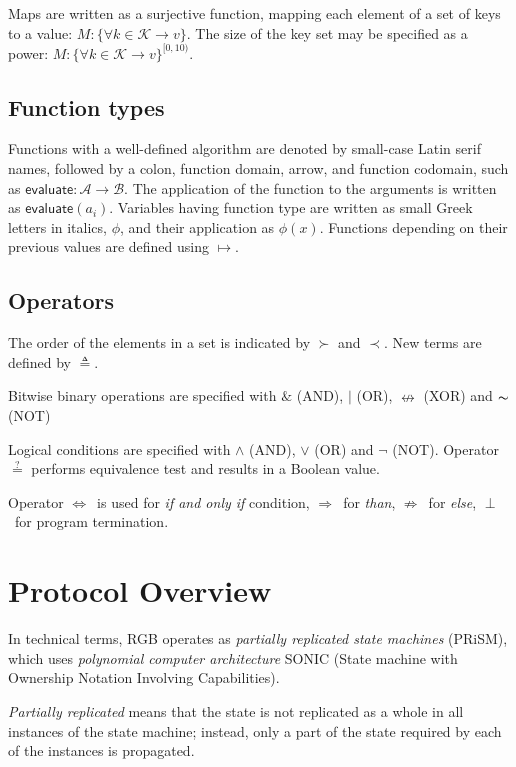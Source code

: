 \documentclass[9pt,oneside]{amsart}
\begin{document}
\begin{multicols}{2}
Maps are written as a surjective function, mapping each element of a set of keys to a value:
$M: \{ \forall k \in \mathcal{K} \rightarrow v \}$.
The size of the key set may be specified as a power:
$M: \{ \forall k \in \mathcal{K} \rightarrow v \}^{[0, 10)}$.

\subsection{Function types}

Functions with a well-defined algorithm are denoted by small-case Latin serif names,
followed by a colon, function domain, arrow, and function codomain,
such as $\mathsf{evaluate}: \mathcal{A} \rightarrow \mathcal{B}$.
The application of the function to the arguments is written as $\mathsf{evaluate}(a_i)$.
Variables having function type are written as small Greek letters in italics, $\phi$,
and their application as $\phi(x)$.
Functions depending on their previous values are defined using
$\mapsto$.

\subsection{Operators}
The order of the elements in a set is indicated by $\succ$ and $\prec$.
New terms are defined by $\triangleq$.

Bitwise binary operations are specified with $\&$ (AND), $|$ (OR),
$\nleftrightarrow$ (XOR) and $\thicksim$ (NOT)

Logical conditions are specified with $\land$ (AND), $\lor$ (OR) and $\lnot$ (NOT).
Operator $\stackrel{?}{=}$ performs equivalence test and results in a Boolean value.

Operator $\Longleftrightarrow$~is used for \emph{if and only if} condition,
$\Rightarrow$~for \emph{than}, $\nRightarrow$~for \emph{else}, $\perp$~for program termination.

\section{Protocol Overview}

In technical terms, RGB operates as \emph{partially replicated state machines} (PRiSM),
which uses \emph{polynomial computer architecture} SONIC
(State machine with Ownership Notation Involving Capabilities).

\emph{Partially replicated} means that the state is not replicated
as a whole in all instances of the state machine;
instead, only a part of the state required by each of the instances is propagated.


\end{multicols}
\end{document}

